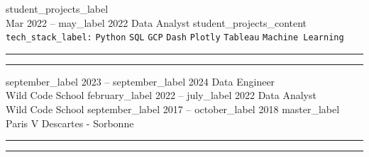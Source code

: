 \documentclass[9pt]{developercv} %
\begin{document}
\begin{entrylist}
        \entry
        {{{student_projects_label}}                                                                           \\\footnotesize{Mar 2022 -- {{may_label}} 2022}}
        {Data Analyst}
        {}
        {{{student_projects_content}}\\
        \texttt{{{tech_stack_label}}:}
        \texttt{Python}\slashsep
        \texttt{SQL}\slashsep
        \texttt{GCP}\slashsep
        \texttt{Dash}\slashsep
        \texttt{Plotly}\slashsep
        \texttt{Tableau}\slashsep
        \texttt{Machine Learning}
        }
    \end{entrylist}
    \noindent
    \textcolor{line-color}{\rule{0.25\textwidth}{0.5pt}} %
    \hfill
    \textcolor{line-color}{\rule{0.725\textwidth}{0.5pt}} %



    \begin{entrylist}
        \entry
        {{{september_label}} 2023 -- {{september_label}} 2024}
        {Data Engineer    \\\footnotesize{Wild Code School}}
        {}
        {}
        \entry
        {{{february_label}} 2022 -- {{july_label}} 2022}
        {Data Analyst     \\\footnotesize{Wild Code School}}
        {}
        {}
        \entry
        {{{september_label}} 2017 -- {{october_label}} 2018}
        {{{master_label}} \\\footnotesize{Paris V Descartes - Sorbonne}}
        {}
        {}
    \end{entrylist}
    \noindent
    \textcolor{line-color}{\rule{0.25\textwidth}{0.5pt}} %
    \hfill
    \textcolor{line-color}{\rule{0.725\textwidth}{0.5pt}} %

\end{document}
